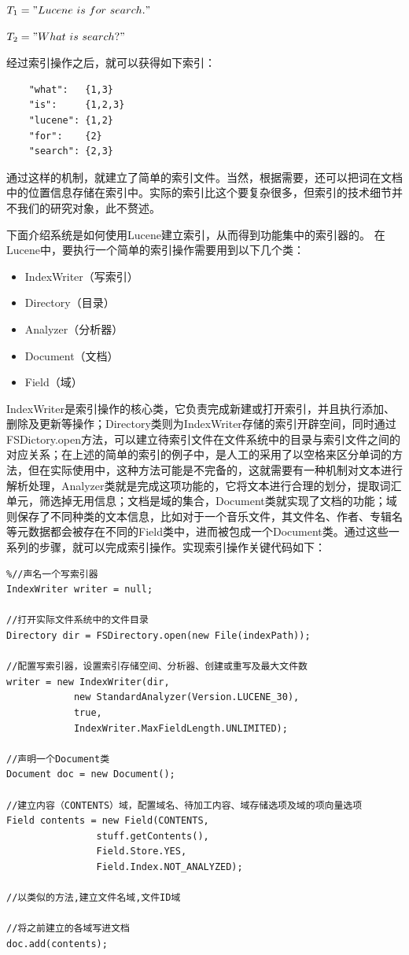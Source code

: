 \documentclass[12pt,a4paper]{article}
\begin{document}
	$T_1 = "Lucene\ is\ for\ search."$
	
	$T_2 = "What\ is\ search?"$
	
	经过索引操作之后，就可以获得如下索引：
	\begin{lstlisting}
	"what":   {1,3}
	"is":     {1,2,3}
	"lucene": {1,2}
	"for":    {2}
	"search": {2,3}
	\end{lstlisting}
	
	通过这样的机制，就建立了简单的索引文件。当然，根据需要，还可以把词在文档中的位置信息存储在索引中。实际的索引比这个要复杂很多，但索引的技术细节并不我们的研究对象，此不赘述。
	
	下面介绍系统是如何使用{\Times Lucene}建立索引，从而得到功能集中的索引器的。
	在{\Times Lucene}中，要执行一个简单的索引操作需要用到以下几个类：
	
	\begin{itemize}
		\item {\Times IndexWriter}（写索引）
		\item {\Times Directory}（目录）
		\item {\Times Analyzer}（分析器）
		\item {\Times Document}（文档）
		\item {\Times Field}（域）
	\end{itemize}
	
	{\Times IndexWriter}是索引操作的核心类，它负责完成新建或打开索引，并且执行添加、删除及更新等操作；{\Times Directory}类则为{\Times IndexWriter}存储的索引开辟空间，同时通过{\Times FSDictory.open}方法，可以建立待索引文件在文件系统中的目录与索引文件之间的对应关系；在上述的简单的索引的例子中，是人工的采用了以空格来区分单词的方法，但在实际使用中，这种方法可能是不完备的，这就需要有一种机制对文本进行解析处理，{\Times Analyzer}类就是完成这项功能的，它将文本进行合理的划分，提取词汇单元，筛选掉无用信息；文档是域的集合，{\Times Document}类就实现了文档的功能；域则保存了不同种类的文本信息，比如对于一个音乐文件，其文件名、作者、专辑名等元数据都会被存在不同的{\Times Field}类中，进而被包成一个{\Times Document}类。通过这些一系列的步骤，就可以完成索引操作。实现索引操作关键代码如下：
	
	\lstset{language=Java,frame=lines,basicstyle=\Times, commentstyle=\SimSun,texcl=true}
	\begin{lstlisting}
%//声名一个写索引器	
IndexWriter writer = null;

//打开实际文件系统中的文件目录
Directory dir = FSDirectory.open(new File(indexPath));

//配置写索引器，设置索引存储空间、分析器、创建或重写及最大文件数
writer = new IndexWriter(dir, 
			new StandardAnalyzer(Version.LUCENE_30), 
			true,
			IndexWriter.MaxFieldLength.UNLIMITED);

//声明一个Document类
Document doc = new Document();

//建立内容（CONTENTS）域，配置域名、待加工内容、域存储选项及域的项向量选项
Field contents = new Field(CONTENTS, 
				stuff.getContents(), 
				Field.Store.YES,
				Field.Index.NOT_ANALYZED);
					 
//以类似的方法,建立文件名域,文件ID域

//将之前建立的各域写进文档
doc.add(contents);
	\end{lstlisting}
	
\end{document}
